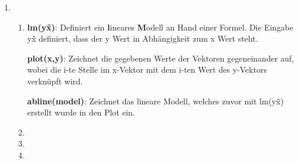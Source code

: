 \documentclass[a4paper]{scrartcl}
\def \blattnr {10}
\begin{document}
\begin{enumerate}[label=\bfseries \blattnr.\arabic*]
\begin{enumerate}
    \end{enumerate}

  \item %
    \begin{enumerate}
     \item %
	\textbf{lm(y\~x)}: Definiert ein \textbf{l}ineares \textbf{M}odell an 
	Hand einer Formel. Die Eingabe y\~x definiert, dass der y Wert in 
	Abhängigkeit zum x Wert steht.
	
	\textbf{plot(x,y)}: Zeichnet die gegebenen Werte der Vektoren 
	gegeneinander auf, wobei die i-te Stelle im x-Vektor mit dem i-ten Wert
	des y-Vektors verknüpft wird.
	
	\textbf{abline(model)}: Zeichnet das lineare Modell, welches zuvor mit 
	lm(y\~x) erstellt wurde in den Plot ein.
     \item %
     \item %
     \item %
    \end{enumerate}
\end{enumerate}
\end{document}
